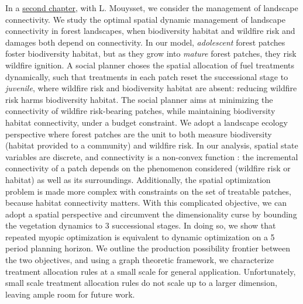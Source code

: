 In a \hyperref[chapter2]{second chapter}, with L. Mouysset, we consider the management of landscape connectivity. We study the optimal spatial dynamic management of landscape connectivity in forest landscapes, when biodiversity habitat and wildfire risk and damages both depend on connectivity. In our model,  \textit{adolescent} forest patches foster biodiversity habitat, but as they grow into \textit{mature} forest patches, they risk wildfire ignition. A social planner choses the spatial allocation of fuel treatments dynamically, such that treatments in each patch reset the successional stage to \textit{juvenile}, where wildfire risk and biodiversity habitat are absent: reducing wildfire risk harms biodiversity habitat. The social planner aims at minimizing the connectivity of wildfire risk-bearing patches, while maintaining biodiversity habitat connectivity, under a budget constraint.
We adopt a landscape ecology perspective where forest patches are the unit to both measure biodiversity (habitat provided to a community) and wildfire risk. In our analysis, spatial state variables are discrete, and connectivity is a non-convex function : the incremental connectivity of a patch depends on the phenomenon considered (wildfire risk or habitat) as well as its surroundings. Additionally, the spatial optimization problem is made more complex with constraints on the set of treatable patches, because habitat connectivity matters. With this complicated objective, we can adopt a spatial perspective and circumvent the dimensionality curse \citep{Bellman} by bounding the vegetation dynamics to 3 successional stages. In doing so, we show that repeated myopic optimization is equivalent to dynamic optimization on a 5 period planning horizon. We outline the production possibility frontier between the two objectives, and using a graph theoretic framework, we characterize treatment allocation rules at a small scale for general application. Unfortunately, small scale treatment allocation rules do not scale up to a larger dimension, leaving ample room for future work.

